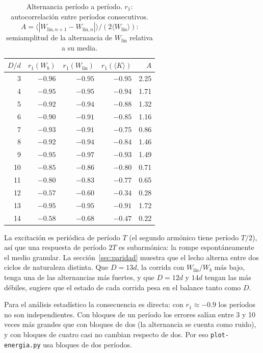 \documentclass[11pt,a4paper]{article}
\newcommand{\code}[1]{\texttt{#1}}
\newcommand{\ave}[1]{\langle #1 \rangle}
\newcommand{\Wb}{W_b}
\newcommand{\Wlin}{W_\text{lin}}
\begin{document}
\begin{table}[ht]
\centering
\small
\caption{Alternancia período a período. $r_1$: autocorrelación entre
  períodos consecutivos. $A = \ave{|W_{\text{lin},n+1} - W_{\text{lin},n}|}
  / (2 \ave{\Wlin})$: semiamplitud de la alternancia de $\Wlin$ relativa a
  su media.}
\label{tab:alternancia}
\begin{tabular}{rrrrr}
  \toprule
  $D/d$ & $r_1(\Wb)$ & $r_1(\Wlin)$ & $r_1(\ave{K})$ & $A$ \\
  \midrule
  3 & $-0.96$ & $-0.95$ & $-0.95$ & 2.25 \\
  4 & $-0.95$ & $-0.95$ & $-0.94$ & 1.71 \\
  5 & $-0.92$ & $-0.94$ & $-0.88$ & 1.32 \\
  6 & $-0.90$ & $-0.91$ & $-0.85$ & 1.16 \\
  7 & $-0.93$ & $-0.91$ & $-0.75$ & 0.86 \\
  8 & $-0.92$ & $-0.94$ & $-0.84$ & 1.46 \\
  9 & $-0.95$ & $-0.97$ & $-0.93$ & 1.49 \\
  10 & $-0.85$ & $-0.86$ & $-0.80$ & 0.71 \\
  11 & $-0.80$ & $-0.83$ & $-0.77$ & 0.65 \\
  12 & $-0.57$ & $-0.60$ & $-0.34$ & 0.28 \\
  13 & $-0.95$ & $-0.95$ & $-0.91$ & 1.72 \\
  14 & $-0.58$ & $-0.68$ & $-0.47$ & 0.22 \\
  \bottomrule
\end{tabular}
\end{table}

La excitación es periódica de período $T$ (el segundo armónico tiene
período $T/2$), así que una respuesta de período $2T$ es subarmónica: la
rompe espontáneamente el medio granular. La sección~\ref{sec:paridad}
muestra que el lecho alterna entre dos ciclos de naturaleza distinta. Que $D = 13d$, la corrida con $\Wlin/\Wb$ más bajo, tenga una de
las alternancias más fuertes, y que $D = 12d$ y $14d$ tengan las más
débiles, sugiere que el estado de cada corrida pesa en el balance tanto
como $D$.

Para el análisis estadístico la consecuencia es directa: con $r_1 \approx
-0.9$ los períodos no son independientes. Con bloques de un período los
errores salían entre 3 y 10 veces más grandes que con bloques de dos (la
alternancia se cuenta como ruido), y con bloques de cuatro casi no cambian
respecto de dos. Por eso \code{plot-energia.py} usa bloques de dos períodos.
\end{document}
